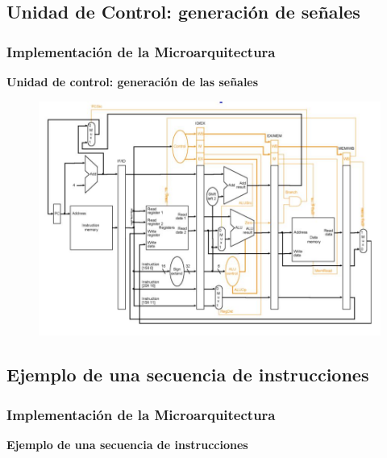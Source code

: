\documentclass[aspectratio=169,compress]{beamer}
\begin{document}
\begin{footnotesize}
\begin{frame}
\end{frame}

\subsection{Unidad de Control: generación de señales}

\begin{frame}
\frametitle{Implementación de la Microarquitectura}
\begin{center}\textbf{Unidad de control: generación de las señales}\end{center}
\begin{figure}
\includegraphics[scale=0.30]{images/control.jpg} 
\end{figure}

\end{frame}

















\subsection{Ejemplo de una secuencia de instrucciones}




\begin{frame}
\frametitle{Implementación de la Microarquitectura}
\begin{center}\textbf{Ejemplo de una secuencia de instrucciones}\end{center}


\end{frame}
\end{footnotesize}
\end{document}
